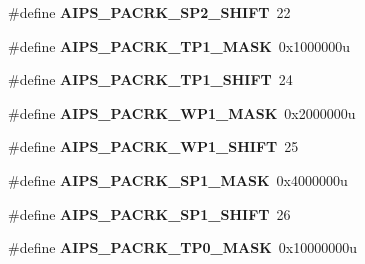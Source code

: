 \begin{DoxyCompactItemize}
\item 
\#define {\bfseries A\+I\+P\+S\+\_\+\+P\+A\+C\+R\+K\+\_\+\+S\+P2\+\_\+\+S\+H\+I\+FT}~22\hypertarget{group__AIPS__Register__Masks_ga5ea3923a30c7eb82e8983ad44ca18fb2}{}\label{group__AIPS__Register__Masks_ga5ea3923a30c7eb82e8983ad44ca18fb2}

\item 
\#define {\bfseries A\+I\+P\+S\+\_\+\+P\+A\+C\+R\+K\+\_\+\+T\+P1\+\_\+\+M\+A\+SK}~0x1000000u\hypertarget{group__AIPS__Register__Masks_ga7168a15a7f6a530a110837dcd79135ee}{}\label{group__AIPS__Register__Masks_ga7168a15a7f6a530a110837dcd79135ee}

\item 
\#define {\bfseries A\+I\+P\+S\+\_\+\+P\+A\+C\+R\+K\+\_\+\+T\+P1\+\_\+\+S\+H\+I\+FT}~24\hypertarget{group__AIPS__Register__Masks_ga679e6b6ddf543077e521b4aee8f758d6}{}\label{group__AIPS__Register__Masks_ga679e6b6ddf543077e521b4aee8f758d6}

\item 
\#define {\bfseries A\+I\+P\+S\+\_\+\+P\+A\+C\+R\+K\+\_\+\+W\+P1\+\_\+\+M\+A\+SK}~0x2000000u\hypertarget{group__AIPS__Register__Masks_ga27f20a594ccdd60e94a0dcf573937cbc}{}\label{group__AIPS__Register__Masks_ga27f20a594ccdd60e94a0dcf573937cbc}

\item 
\#define {\bfseries A\+I\+P\+S\+\_\+\+P\+A\+C\+R\+K\+\_\+\+W\+P1\+\_\+\+S\+H\+I\+FT}~25\hypertarget{group__AIPS__Register__Masks_ga6d57363e72571d3694fe8dfeef5685fc}{}\label{group__AIPS__Register__Masks_ga6d57363e72571d3694fe8dfeef5685fc}

\item 
\#define {\bfseries A\+I\+P\+S\+\_\+\+P\+A\+C\+R\+K\+\_\+\+S\+P1\+\_\+\+M\+A\+SK}~0x4000000u\hypertarget{group__AIPS__Register__Masks_gaa2a112318ff0026b5978abde4c76e284}{}\label{group__AIPS__Register__Masks_gaa2a112318ff0026b5978abde4c76e284}

\item 
\#define {\bfseries A\+I\+P\+S\+\_\+\+P\+A\+C\+R\+K\+\_\+\+S\+P1\+\_\+\+S\+H\+I\+FT}~26\hypertarget{group__AIPS__Register__Masks_ga700f8a7b64f0c4943958fc5230e0aa5d}{}\label{group__AIPS__Register__Masks_ga700f8a7b64f0c4943958fc5230e0aa5d}

\item 
\#define {\bfseries A\+I\+P\+S\+\_\+\+P\+A\+C\+R\+K\+\_\+\+T\+P0\+\_\+\+M\+A\+SK}~0x10000000u\hypertarget{group__AIPS__Register__Masks_ga8c115f9c89041a2fdca48962be0ca305}{}\label{group__AIPS__Register__Masks_ga8c115f9c89041a2fdca48962be0ca305}


\end{DoxyCompactItemize}
